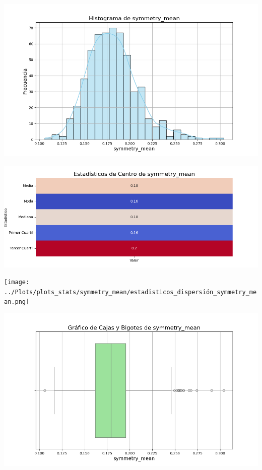 \documentclass[a4paper, 12pt]{article}
\begin{document}
	\includegraphics[width=\textwidth]{../Plots/plots_stats/symmetry_mean/histograma_symmetry_mean.png}




\includegraphics[width=\textwidth]{../Plots/plots_stats/symmetry_mean/estadisticas_centro_symmetry_mean.png}




\texttt{[image: ../Plots/plots\_stats/symmetry\_mean/estadisticos\_dispersión\_symmetry\_mean.png]}



\includegraphics[width=\textwidth]{../Plots/plots_stats/symmetry_mean/boxplot_symmetry_mean.png}
\end{document}
